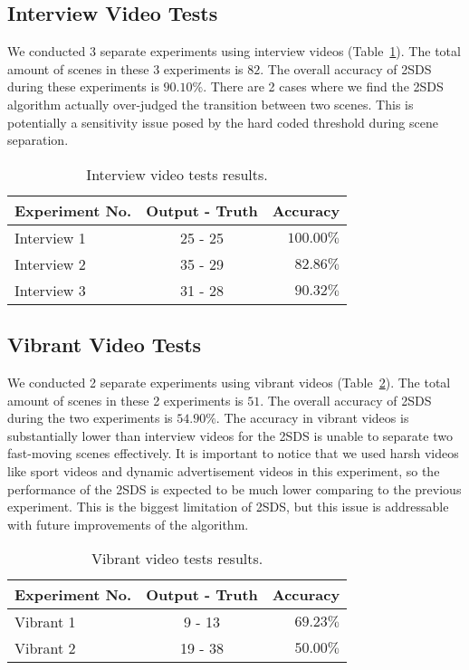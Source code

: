 \documentclass[
twocolumn,
]{ceurart}
\begin{document}
\subsection{Interview Video Tests}
We conducted 3 separate experiments using interview videos (Table~\ref{tab:interview}). The total amount of scenes in these 3 experiments is $82$. The overall accuracy of 2SDS during these experiments is $90.10\%$. There are 2 cases where we find the 2SDS algorithm actually over-judged the transition between two scenes. This is potentially a sensitivity issue posed by the hard coded threshold during scene separation.

\begin{table}
  \caption{Interview video tests results.}
  \label{tab:interview}
  \begin{tabular}{lcr}
    \toprule
    Experiment No.&	Output - Truth&	Accuracy\\
    \midrule
    Interview 1 &	25 - 25 &	$100.00\%$\\
Interview 2 &	35 - 29 &	$82.86\%$\\
Interview 3 &	31 - 28 &	$90.32\%$\\
  \bottomrule
\end{tabular}
\end{table}

\subsection{Vibrant Video Tests}
We conducted 2 separate experiments using vibrant videos (Table~\ref{tab:vibrant}). The total amount of scenes in these 2 experiments is $51$. The overall accuracy of 2SDS during the two experiments is $54.90\%$. The accuracy in vibrant videos is substantially lower than interview videos for the 2SDS is unable to separate two fast-moving scenes effectively. It is important to notice that we used harsh videos like sport videos and dynamic advertisement videos in this experiment, so the performance of the 2SDS is expected to be much lower comparing to the previous experiment. This is the biggest limitation of 2SDS, but this issue is addressable with future improvements of the algorithm.

\begin{table}
  \caption{Vibrant video tests results.}
  \label{tab:vibrant}
  \begin{tabular}{lcr}
    \toprule
    Experiment No.&	Output - Truth&	Accuracy\\
    \midrule
    Vibrant 1 &	9 - 13 &	$69.23\%$\\
Vibrant 2 &	19 - 38 &	$50.00\%$\\
  \bottomrule
\end{tabular}
\end{table}
\end{document}
